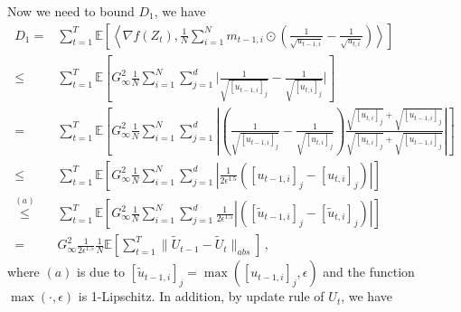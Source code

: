 \documentclass[11pt]{article}
\begin{document}
Now we need to bound $D_1$, we have
\begin{align}\label{eq: T_1}
D_1 = & \sum_{t=1}^T   \mathbb E \left [\left \langle \nabla f( Z_{t}) , \frac{1}{N} \sum_{i=1}^N m_{t-1	,i} \odot (\frac{1}{\sqrt{u_{t-1,i}}} - \frac{1}{\sqrt{u_{t,i}}}) \right \rangle \right] \nonumber \\
\leq & \sum_{t=1}^T   \mathbb E \left [   G_{\infty}^2 \frac{1}{N} \sum_{i=1}^N \sum_{j=1}^d \bigg|\frac{1}{\sqrt{[u_{t-1,i}]_j}} - \frac{1}{\sqrt{[u_{t,i}]_j}}\bigg|   \right] \nonumber \\
= & \sum_{t=1}^T   \mathbb E \left [   G_{\infty}^2 \frac{1}{N} \sum_{i=1}^N \sum_{j=1}^d \left|\left(\frac{1}{\sqrt{[u_{t-1,i}]_j}} - \frac{1}{\sqrt{[u_{t,i}]_j}}\right) \frac{\sqrt{[u_{t,i}]_j}+\sqrt{[u_{t-1,i}]_j}}{\sqrt{[u_{t,i}]_j}+\sqrt{[u_{t-1,i}]_j}}\right|    \right] \nonumber \\
\leq & \sum_{t=1}^T   \mathbb E \left [   G_{\infty}^2 \frac{1}{N} \sum_{i=1}^N \sum_{j=1}^d \left|\frac{1}{2\epsilon^{1.5}}\left({{[u_{t-1,i}]_j}} - {{[u_{t,i}]_j}}\right) \right|    \right] \nonumber \\
\overset{(a)}{\leq} & \sum_{t=1}^T   \mathbb E \left [   G_{\infty}^2 \frac{1}{N} \sum_{i=1}^N \sum_{j=1}^d\frac{1}{2\epsilon^{1.5}} \left|\left({{[\tilde u_{t-1,i}]_j}} - {{[\tilde u_{t,i}]_j}}\right) \right|    \right]  \nonumber \\
= &  G_{\infty}^2 \frac{1}{2\epsilon^{1.5}} \frac{1}{N}   \mathbb E \left [  \sum_{t=1}^T   \|{{\tilde U_{t-1}}} - {{\tilde U_{t}}\|_{abs}}    \right] \, ,  
\end{align}
where $(a)$ is due to $[\tilde u_{t-1,i}]_j = \max ([u_{t-1,i}]_j,\epsilon)$ and the function $\max(\cdot,\epsilon)$ is 1-Lipschitz.
In addition, by update rule of $U_t$, we have 
\end{document}
